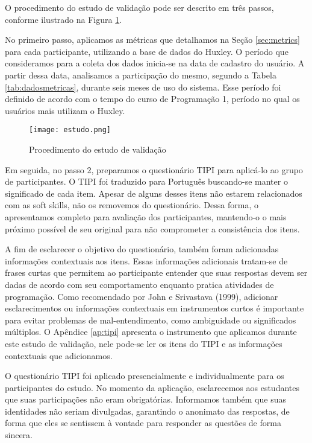 O procedimento do estudo de validação pode ser descrito em três passos, conforme ilustrado na Figura \ref{fig:estudo}.

No primeiro passo, aplicamos as métricas que detalhamos na Seção \ref{sec:metrics} para cada participante, utilizando a base de dados do Huxley. O período que consideramos para a coleta dos dados inicia-se na data de cadastro do usuário. A partir dessa data, analisamos a participação do mesmo, segundo a Tabela \ref{tab:dadosmetricas}, durante seis meses de uso do sistema. Esse período foi definido de acordo com o tempo do curso de Programação 1, período no qual os usuários mais utilizam o Huxley.%

\begin{figure}[ht]
\centering
\caption{\small Procedimento do estudo de validação} 
\texttt{[image: estudo.png]}
\label{fig:estudo}
\end{figure}

Em seguida, no passo 2, preparamos o questionário TIPI para aplicá-lo ao grupo de participantes. O TIPI foi traduzido para Português buscando-se manter o significado de cada item. Apesar de alguns desses itens não estarem relacionados com as soft skills, não os removemos do questionário. Dessa forma, o apresentamos completo para avaliação dos participantes, mantendo-o o mais próximo possível de seu original para não comprometer a consistência dos itens.

A fim de esclarecer o objetivo do questionário, também foram adicionadas informações contextuais aos itens. Essas informações adicionais tratam-se de frases curtas que permitem ao participante entender que suas respostas devem ser dadas de acordo com seu comportamento enquanto pratica atividades de programação. Como recomendado por John e Srivastava (1999)\nocite{john:99}, adicionar esclarecimentos ou informações contextuais em instrumentos curtos é importante para evitar problemas de mal-entendimento, como ambiguidade ou significados múltiplos.
O Apêndice \ref{ap:tipi} apresenta o instrumento que aplicamos durante este estudo de validação, nele pode-se ler os itens do TIPI e as informações contextuais que adicionamos.

O questionário TIPI foi aplicado presencialmente e individualmente para os participantes do estudo. No momento da aplicação, esclarecemos aos estudantes que suas participações não eram obrigatórias. Informamos também que suas identidades não seriam divulgadas, garantindo o anonimato das respostas, de forma que eles se sentissem à vontade para responder as questões de forma sincera.

